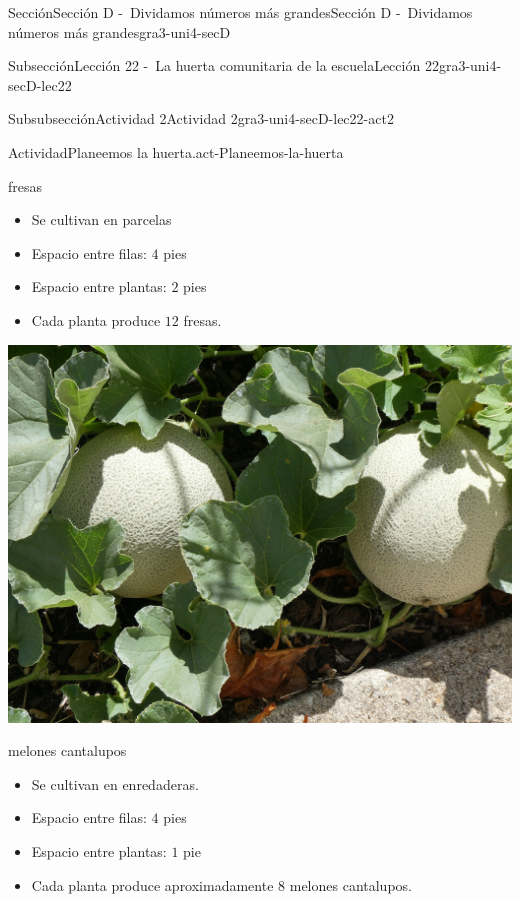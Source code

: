 \documentclass[twoside,10pt,]{article}
\begin{document}
\begin{sectionptx}{Sección}{Sección D -~Dividamos números más grandes}{}{Sección D -~Dividamos números más grandes}{}{}{gra3-uni4-secD}
\begin{subsectionptx}{Subsección}{Lección 22 -~La huerta comunitaria de la escuela}{}{Lección 22}{}{}{gra3-uni4-secD-lec22}
\begin{subsubsectionptx}{Subsubsección}{Actividad 2}{}{Actividad 2}{}{}{gra3-uni4-secD-lec22-act2}
\begin{activity}{Actividad}{Planeemos la huerta.}{act-Planeemos-la-huerta}
\begin{sidebyside}{2}{0.025}{0.025}{0.05}
\begin{sbspanel}{0.45}
%
\par
fresas%
%
\begin{itemize}[label=\textbullet]
\item{}Se cultivan en parcelas%
\item{}Espacio entre filas: \(4\) pies%
\item{}Espacio entre plantas: \(2\) pies%
\item{}Cada planta produce \(12\) fresas.%
\end{itemize}
\end{sbspanel}%
\begin{sbspanel}{0.45}%
\includegraphics[width=\linewidth]{external/jpg-source/3-4-D-22 Act2-melon-cantalupo.jpg}
%
\par
melones cantalupos%
%
\begin{itemize}[label=\textbullet]
\item{}Se cultivan en enredaderas.%
\item{}Espacio entre filas: \(4\) pies%
\item{}Espacio entre plantas: \(1\) pie%
\item{}Cada planta produce aproximadamente \(8\) melones cantalupos.%
\end{itemize}
\end{sbspanel}%
\end{sidebyside}%
\begin{sidebyside}{2}{0.025}{0.025}{0.05}%
\begin{sbspanel}{0.45}%

\end{sbspanel}
\end{sidebyside}
\end{activity}
\end{subsubsectionptx}
\end{subsectionptx}
\end{sectionptx}
\end{document}
